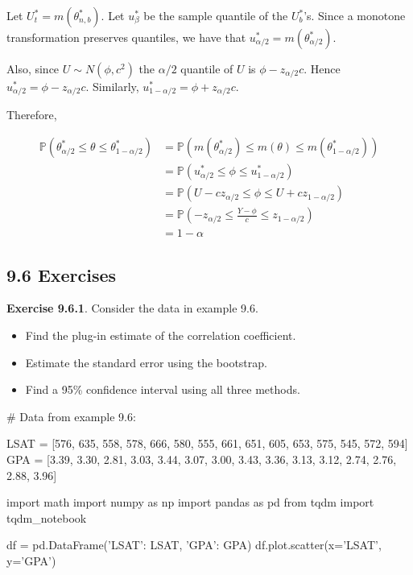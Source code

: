 Let \(U_t^* = m(\theta_{n, b}^*)\). Let \(u_\beta^*\) be the sample
quantile of the \(U_b^*\)'s. Since a monotone transformation preserves
quantiles, we have that \(u_{\alpha/2}^* = m(\theta_{\alpha/2}^*)\).

Also, since \(U \sim N(\phi, c^2)\) the \(\alpha/2\) quantile of \(U\)
is \(\phi - z_{\alpha/2}c\). Hence
\(u_{\alpha/2}^* = \phi - z_{\alpha/2}c\). Similarly,
\(u_{1 - \alpha/2}^* = \phi + z_{\alpha/2}c\).

Therefore,

\begin{align}
\mathbb{P}(\theta_{\alpha/2}^* \leq \theta \leq \theta_{1 - \alpha/2}^*) &=
\mathbb{P}(m(\theta_{\alpha/2}^*) \leq m(\theta) \leq m(\theta_{1 - \alpha/2}^*)) \\
&= \mathbb{P}(u_{\alpha/2}^* \leq \phi \leq u_{1 - \alpha/2}^*) \\
&= \mathbb{P}(U - cz_{\alpha/2} \leq \phi \leq U + cz_{1 - \alpha/2}) \\
&= \mathbb{P}\left(-z_{\alpha/2} \leq \frac{Y - \phi}{c} \leq z_{1 - \alpha/2} \right) \\
&= 1 - \alpha
\end{align}

\subsection{9.6 Exercises}\label{exercises}

\textbf{Exercise 9.6.1}. Consider the data in example 9.6.

\begin{itemize}[tightlist]
\item
  Find the plug-in estimate of the correlation coefficient.\\
\item
  Estimate the standard error using the bootstrap.\\
\item
  Find a 95\% confidence interval using all three methods.
\end{itemize}

\begin{python}
# Data from example 9.6:

LSAT = [576, 635, 558, 578, 666, 580, 555, 661, 651, 605, 653, 575, 545, 572, 594]
GPA = [3.39, 3.30, 2.81, 3.03, 3.44, 3.07, 3.00, 3.43, 3.36, 3.13, 3.12, 2.74, 2.76, 2.88, 3.96]
\end{python}

\begin{python}
import math
import numpy as np
import pandas as pd
from tqdm import tqdm_notebook

df = pd.DataFrame({'LSAT': LSAT, 'GPA': GPA})
df.plot.scatter(x='LSAT', y='GPA')
\end{python}

